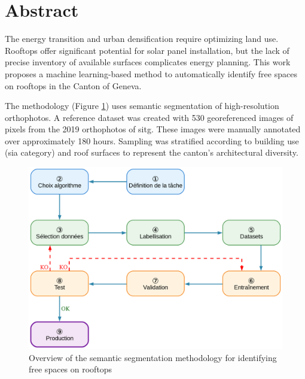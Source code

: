 \chapter*{Abstract}

The energy transition and urban densification require optimizing land use. Rooftops offer significant potential for solar panel installation, but the lack of precise inventory of available surfaces complicates energy planning. This work proposes a machine learning-based method to automatically identify free spaces on rooftops in the Canton of Geneva.

The methodology (Figure \ref{fig:abstract_ch3_resume_machine_learning_supervise}) uses semantic segmentation of high-resolution orthophotos. A reference dataset was created with 530 georeferenced images of \si{} pixels from the 2019 orthophotos of \acrshort{sitg}. These images were manually annotated over approximately 180 hours. Sampling was stratified according to building use (\gls{sia} category) and roof surfaces to represent the canton's architectural diversity.

\begin{figure}[htbp]
    \centering
    \includegraphics[width=1\linewidth]{03-tail/A1_fondamentaux_ML/A1_figures/A1_01_resume_machine_learning_supervise.png}
    \caption{Overview of the semantic segmentation methodology for identifying free spaces on rooftops}
    \label{fig:abstract_ch3_resume_machine_learning_supervise}
\end{figure}


